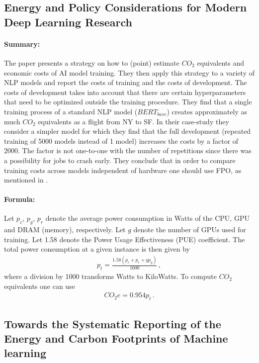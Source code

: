 \documentclass[a4paper, 12pt]{article}
\begin{document}
\subsection{Energy and Policy Considerations for Modern Deep Learning Research}
\label{seq:Strubell_2020}
\centerline{}
\vspace{1em}

\paragraph{Summary:} The paper presents a strategy on how to (point) estimate $CO_2$
equivalents and economic costs of AI model training. They then apply this strategy to a
variety of NLP models and report the costs of training and the costs of development. The
costs of development takes into account that there are certain hyperparameters that need
to be optimized outside the training procedure. They find that a single training process
of a standard NLP model ($BERT_{base}$) creates approximately as much $CO_2$ equivalents
as a flight from NY to SF. In their case-study they consider a simpler model for which
they find that the full development (repeated training of 5000 models instead of 1
model) increases the costs by a factor of 2000. The factor is not one-to-one with the
number of repetitions since there was a possibility for jobs to crash early. They
conclude that in order to compare training costs across models independent of hardware
one should use FPO, as mentioned in .

\paragraph{Formula:} Let $p_c$, $p_g$, $p_r$ denote the average power consumption in
Watts of the CPU, GPU and DRAM (memory), respectively. Let $g$ denote the number of GPUs
used for training. Let 1.58 denote the Power Usage Effectiveness (PUE) coefficient. The
total power consumption at a given instance is then given by
\begin{align}
    p_t = \frac{1.58 (p_c + p_r + g p_g)}{1000} \,,
\end{align}
where a division by 1000 transforms Watts to KiloWatts. To compute $CO_2$ equivalents
one can use
\begin{align}
    CO_2e = 0.954 p_t \,.
\end{align}


\subsection{Towards the Systematic Reporting of the Energy and Carbon Footprints of
Machine learning}
\label{seq:Henderson_2020}
\centerline{}
\vspace{1em}
\end{document}
